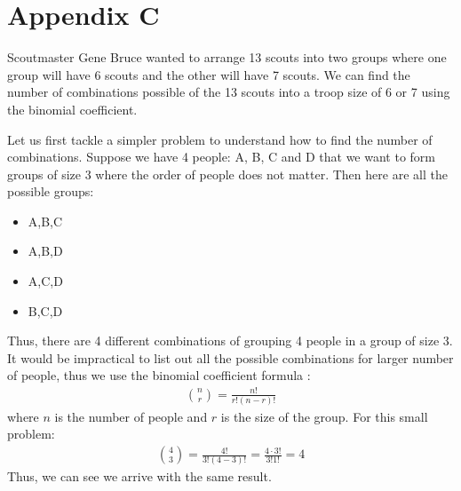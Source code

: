 \documentclass{amsart}
\theoremstyle{definition}
\theoremstyle{remark}
\numberwithin{equation}{section}
\begin{document}
\section*{Appendix C}
Scoutmaster Gene Bruce wanted to arrange 13 scouts into two groups where one group will have 6 scouts and the other will have 7 scouts. We can find the number of combinations possible of the 13 scouts into a troop size of 6 or 7 using the binomial coefficient.

Let us first tackle a simpler problem to understand how to find the number of combinations. Suppose we have 4 people: A, B, C and D that we want to form groups of size 3 where the order of people does not matter. Then here are all the possible groups:
\begin{itemize}
	\item A,B,C	
	\item A,B,D
	\item A,C,D	
	\item B,C,D
\end{itemize}
Thus, there are 4 different combinations of grouping 4 people in a group of size 3. It would be impractical to list out all the possible combinations for larger number of people, thus we use the binomial coefficient formula \cite{F}:
\begin{gather*}
	\binom{n}{r} = \frac{n!}{r!(n-r)!}
\end{gather*}
where $n$ is the number of people and $r$ is the size of the group. For this small problem:
\begin{gather*}
	\binom{4}{3} = \frac{4!}{3!(4-3)!} = \frac{4\cdot3!}{3!1!} = 4
\end{gather*} 
Thus, we can see we arrive with the same result.
\end{document}
